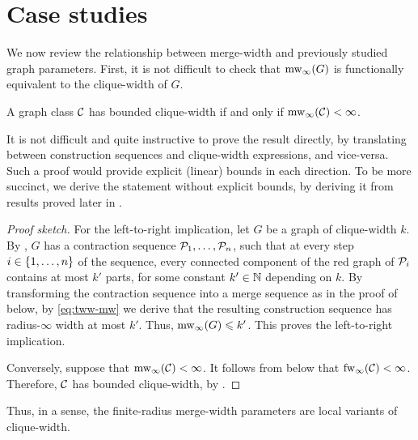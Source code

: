 










\section{Case studies}\label{sec:cases}
We now review the relationship between
merge-width and previously studied graph parameters.
First, it is not difficult to check that 
$\mw_\infty(G)$ is functionally equivalent to the clique-width of $G$. 
\begin{theorem}\label{thm:cw}
  A graph class $\CC$ has bounded clique-width if and only if $\mw_\infty(\CC)<\infty$.
\end{theorem}


    It is not difficult and quite instructive to prove the result directly,
    by translating between construction sequences and clique-width expressions, and vice-versa.
    Such a proof would provide explicit (linear) bounds in each direction.
    To be more succinct, we derive the statement without explicit bounds, by deriving it from results proved later in .

\begin{proof}[Proof sketch]

    For the left-to-right implication,
    let $G$ be a graph of clique-width $k$.
    By \cite[Thm. 1]{tww6}, $G$ has a contraction sequence $\cal P_1,\ldots,\cal P_n$, such that at every 
    step $i\in\set{1,\ldots,n}$ of the sequence,
    every connected component of the red graph of $\cal P_i$ contains 
    at most $k'$ parts, for some constant $k'\in\N$ depending on $k$.
    By transforming the contraction sequence into a merge sequence as in the proof of  below, by \eqref{eq:tww-mw} we derive that the resulting construction sequence has radius-$\infty$ width at most $k'$. Thus, $\mw_\infty(G)\le k'$.
    This proves the left-to-right implication.

    Conversely, suppose that $\mw_\infty(\CC)<\infty$.
    It follows from  below that $\fw_\infty(\CC)<\infty$.
    Therefore, $\CC$ has bounded clique-width, by \cite[Thm. II.6]{flip-width}.
\end{proof}






\noindent Thus, in a sense, the finite-radius merge-width parameters are local variants of clique-width.













